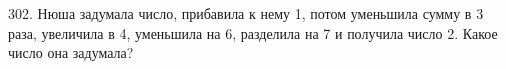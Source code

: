 302. Нюша задумала число, прибавила к нему 1, потом уменьшила сумму в 3 раза, увеличила в 4, уменьшила на 6, разделила на 7 и получила число 2. Какое число она задумала?\\

